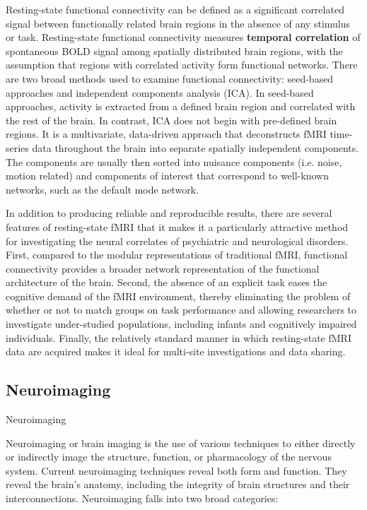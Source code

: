 \documentclass{article}
\begin{document}
Resting-state functional connectivity can be defined as a significant
correlated signal between functionally related brain regions in the
absence of any stimulus or task. Resting-state functional connectivity
measures \textbf{temporal correlation} of spontaneous BOLD signal
among spatially distributed brain regions, with the assumption that
regions with correlated activity form functional networks. There are
two broad methods used to examine functional connectivity: seed-based
approaches and independent components analysis (ICA). In seed-based
approaches, activity is extracted from a defined brain region and
correlated with the rest of the brain. In contrast, ICA does not begin
with pre-defined brain regions. It is a multivariate, data-driven
approach that deconstructs fMRI time-series data throughout the brain
into separate spatially independent components. The components are
usually then sorted into nuisance components (i.e.  noise, motion
related) and components of interest that correspond to well-known
networks, such as the default mode network.

In addition to producing reliable and reproducible results, there are
several features of resting-state fMRI that it makes it a particularly
attractive method for investigating the neural correlates of
psychiatric and neurological disorders. First, compared to the modular
representations of traditional fMRI, functional connectivity provides
a broader network representation of the functional architecture of the
brain. Second, the absence of an explicit task eases the cognitive
demand of the fMRI environment, thereby eliminating the problem of
whether or not to match groups on task performance and allowing
researchers to investigate under-studied populations, including
infants and cognitively impaired individuals.  Finally, the relatively
standard manner in which resting-state fMRI data are acquired makes it
ideal for multi-site investigations and data sharing.

\subsection{Neuroimaging}

Neuroimaging

Neuroimaging or brain imaging is the use of various techniques to
either directly or indirectly image the structure, function, or
pharmacology of the nervous system. Current neuroimaging techniques
reveal both form and function. They reveal the brain's anatomy,
including the integrity of brain structures and their
interconnections. Neuroimaging falls into two broad categories:
\end{document}
